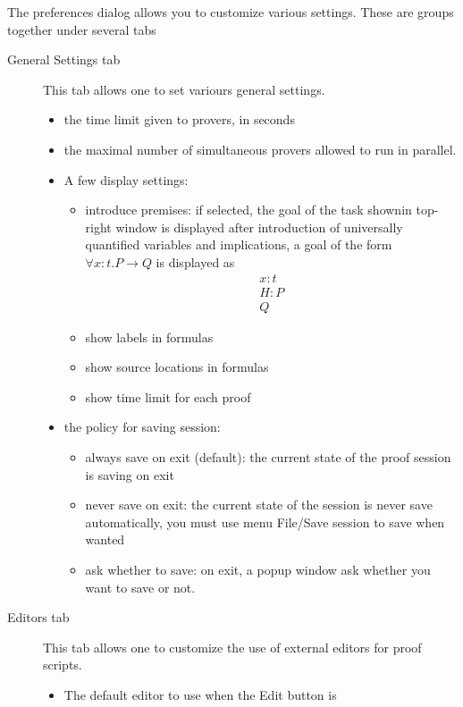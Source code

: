 The preferences dialog allows you to customize various settings. These
are groups together under several tabs

\begin{description}
\item[\textsf{General Settings} tab] This tab allows one to set
  variours general settings.
\begin{itemize}
\item the time limit given to provers, in seconds
\item the maximal number of simultaneous provers allowed to run in
  parallel.
\item A few display settings:
  \begin{itemize}
  \item introduce premises: if selected, the goal of the task shownin
    top-right window is displayed after introduction of universally
    quantified variables and implications, \eg a goal of the form
    $\forall x: t. P \rightarrow Q$ is displayed as
    \[
    \begin{array}{l}
      x : t \\
      H : P \\
      \hline
      Q
    \end{array}
    \]
  \item show labels in formulas
  \item show source locations in formulas
  \item show time limit for each proof
  \end{itemize}
\item the policy for saving session:
  \begin{itemize}
  \item always save on exit (default): the current state of the proof session is saving on exit
  \item never save on exit: the current state of the session is never save automatically, you must use menu \textsf{File/Save session} to save when wanted
  \item ask whether to save: on exit, a popup window ask whether you
    want to save or not.
  \end{itemize}
\end{itemize}
\item[\textsf{Editors} tab] This tab allows one to customize the use
  of external editors for proof scripts.
\begin{itemize}
\item The default editor to use when the \textsf{Edit} button is

\end{itemize}
\end{description}
